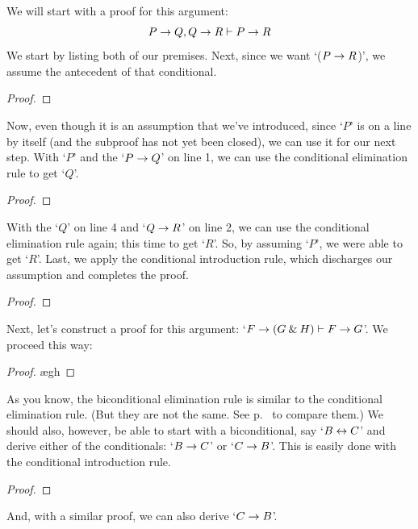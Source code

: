 \begin{earg}
\item We will start with a proof for this argument:
	$$P \rightarrow Q, Q \rightarrow R \vdash P \rightarrow R$$
We start by listing both of our premises. Next, since we want `($P \rightarrow R$)', we assume the antecedent of that conditional. 
\begin{proof}
	 \pr{}
	 \pr{}
	\open
		 \as{}
	\close
\end{proof}
Now, even though it is an assumption that we've introduced, since `$P$' is on a line by itself (and the subproof has not yet been closed), we can use it for our next step. With `$P$' and the `$P \rightarrow Q$' on line 1, we can use the conditional elimination rule to get `$Q$'. 
\begin{proof}
	 \pr{}
	 \pr{}
	\open
		\as{}
	\close
\end{proof}
With the `$Q$' on line 4 and `$Q \rightarrow R$' on line 2, we can use the conditional elimination rule again; this time to get `$R$'. So, by assuming `$P$', we were able to get `$R$'. Last, we apply the conditional introduction rule, which discharges our assumption and completes the proof.
\label{HSproof}
\begin{proof}
	 \pr{}
	 \pr{}
	\open
		\as{}
	\close
\end{proof}

\item Next, let's construct a proof for this argument: `$F \rightarrow (G \mathbin{\&} H) \vdash F \rightarrow G$'. We proceed this way:

\begin{proof}
	 \pr{}
	\open
		\as{}
		\ae{gh}
	\close
\end{proof}

\item As you know, the biconditional elimination rule is similar to the conditional elimination rule. (But they are not the same. See p.~\pageref{ce-rule} to compare them.) We should also, however, be able to start with a biconditional, say `$B \leftrightarrow C$' and derive either of the conditionals: `$B \rightarrow C$' or `$C \rightarrow B$'. This is easily done with the conditional introduction rule.
\begin{proof}
	 \pr{}
	\open
		\as{}
	\close
\end{proof}
\smallskip
\noindent And, with a similar proof, we can also derive `$C \rightarrow B$'.


\end{earg}
